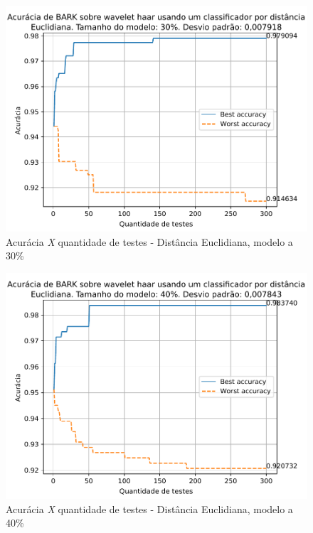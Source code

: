 \begin{myenv}{1.5}
			\newpage
			\begin{figure}[h]
				\centering
				\includegraphics{images/results/confusionMatrices/classifier_Euclidian_30}
				\caption{Acurácia \textit{X} quantidade de testes - Distância Euclidiana, modelo a 30\%}
				\label{fig:classifiereuclidian30}
			\end{figure}
			
	
			\newpage	
			\begin{figure}[h]
				\centering
				\includegraphics{images/results/confusionMatrices/classifier_Euclidian_40}
				\caption{Acurácia \textit{X} quantidade de testes - Distância Euclidiana, modelo a 40\%}
				\label{fig:classifiereuclidian40}
			\end{figure}
			
		

\end{myenv}
